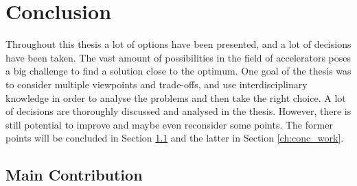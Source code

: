 \documentclass[mscthesis]{usiinfthesis}
\begin{document}
\chapter{Conclusion}
\label{ch:conc}
\glsresetall %

Throughout this thesis a lot of options have been presented, and a lot of
decisions have been taken. The vast amount of possibilities in the field of
accelerators poses a big challenge to find a solution close to the optimum.
One goal of the thesis was to consider multiple viewpoints and trade-offs, and
use interdisciplinary knowledge in order to analyse the problems and then take
the right choice. A lot of decisions are thoroughly discussed and analysed in
the thesis. However, there is still potential to improve and maybe even
reconsider some points. The former points will be concluded in Section
\ref{ch:conc_ach} and the latter in Section \ref{ch:conc_work}.

\section{Main Contribution}
\label{ch:conc_ach}
\end{document}
